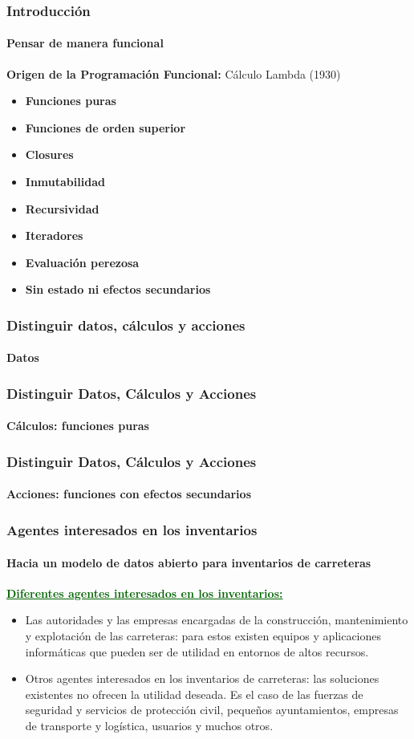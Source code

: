 \documentclass[aspectratio = 169, 12pt]{beamer}
\begin{document}
\begin{frame}
	\frametitle{Introducción}
	\framesubtitle{Pensar de manera funcional}

   {\textbf{Origen de la Programación Funcional:} Cálculo Lambda (1930) \par}
   \vspace{1em}
	\begin{itemize}
      \item \textbf{Funciones puras}
      \item \textbf{Funciones de orden superior}
      \item \textbf{Closures}
      \item \textbf{Inmutabilidad}
      \item \textbf{Recursividad}
      \item \textbf{Iteradores}
      \item \textbf{Evaluación perezosa}
      \item \textbf{Sin estado ni efectos secundarios}
	\end{itemize}
\end{frame}

\begin{frame}
	\frametitle{Distinguir datos, cálculos y acciones}
	\framesubtitle{Datos}


\end{frame}

\begin{frame}
	\frametitle{Distinguir Datos, Cálculos y Acciones}
	\framesubtitle{Cálculos: funciones puras}


\end{frame}

\begin{frame}
	\frametitle{Distinguir Datos, Cálculos y Acciones}
	\framesubtitle{Acciones: funciones con efectos secundarios}


\end{frame}

\begin{frame}
	\frametitle{Agentes interesados en los inventarios}
	\framesubtitle{Hacia un modelo de datos abierto para inventarios de carreteras}

	\begin{center}
		\textcolor{darkgreen}{\underline{\textbf{Diferentes agentes interesados en los inventarios:}}}
	\end{center}

	\vspace{0.5em}
	\begin{itemize}
		\item Las autoridades y las empresas encargadas de la construcción, mantenimiento y explotación de las carreteras: para estos existen equipos y aplicaciones informáticas que pueden ser de utilidad en entornos de altos recursos.
		\item Otros agentes interesados en los inventarios de carreteras: las soluciones existentes no ofrecen la utilidad deseada. Es el caso de las fuerzas de seguridad y servicios de protección civil, pequeños ayuntamientos, empresas de transporte y logística, usuarios y muchos otros.
\end{itemize}
\end{frame}
\end{document}
